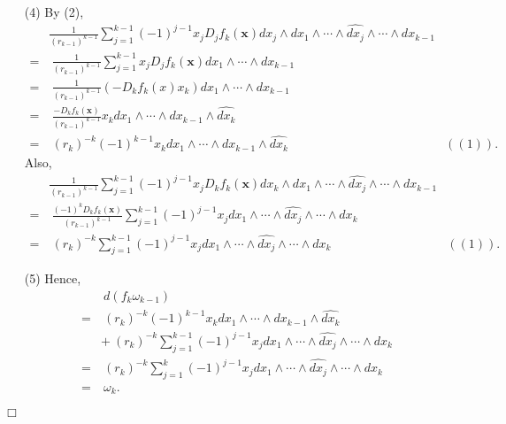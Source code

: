 \documentclass{article}
\begin{document}
\begin{enumerate}
\item[(4)]
  By (2),
  \begin{align*}
    &\frac{1}{(r_{k-1})^{k-1}}
      \sum_{j=1}^{k-1}
      (-1)^{j-1} x_j D_j f_k(\mathbf{x})
      dx_j \wedge dx_1 \wedge \cdots
        \wedge \widehat{dx_j} \wedge \cdots \wedge dx_{k-1} \\
    =& \:
    \frac{1}{(r_{k-1})^{k-1}}
      \sum_{j=1}^{k-1}
      x_j D_j f_k(\mathbf{x})
      dx_1 \wedge \cdots \wedge dx_{k-1} \\
    =& \:
    \frac{1}{(r_{k-1})^{k-1}}
      (-D_k f_k(x) x_k)
      dx_1 \wedge \cdots \wedge dx_{k-1} \\
    =& \:
    \frac{-D_k f_k(\mathbf{x})}{(r_{k-1})^{k-1}}
      x_k dx_1 \wedge \cdots \wedge dx_{k-1} \wedge \widehat{dx_{k}} \\
    =& \:
    (r_{k})^{-k}
      (-1)^{k-1} x_k dx_1 \wedge \cdots \wedge dx_{k-1} \wedge \widehat{dx_{k}}
      & ((1)).
  \end{align*}
  Also,
  \begin{align*}
    &\frac{1}{(r_{k-1})^{k-1}}
      \sum_{j=1}^{k-1}
      (-1)^{j-1} x_j D_k f_k(\mathbf{x})
      dx_k \wedge dx_1 \wedge \cdots
        \wedge \widehat{dx_j} \wedge \cdots \wedge dx_{k-1} \\
    =& \:
    \frac{(-1)^{k} D_k f_k(\mathbf{x})}{(r_{k-1})^{k-1}}
      \sum_{j=1}^{k-1} (-1)^{j-1} x_j
        dx_1 \wedge \cdots \wedge \widehat{dx_j} \wedge \cdots \wedge dx_{k} \\
    =& \:
    (r_{k})^{-k}
      \sum_{j=1}^{k-1} (-1)^{j-1} x_j
        dx_1 \wedge \cdots \wedge \widehat{dx_j} \wedge \cdots \wedge dx_{k}
      & ((1)).
  \end{align*}

\item[(5)]
  Hence,
  \begin{align*}
    & \: d(f_k \omega_{k-1}) \\
    =& \: (r_{k})^{-k}
      (-1)^{k-1} x_k dx_1 \wedge \cdots \wedge dx_{k-1} \wedge \widehat{dx_{k}} \\
      &+ \: (r_{k})^{-k}
        \sum_{j=1}^{k-1} (-1)^{j-1} x_j
          dx_1 \wedge \cdots \wedge \widehat{dx_j} \wedge \cdots \wedge dx_{k} \\
    =& \: (r_{k})^{-k}
      \sum_{j=1}^{k} (-1)^{j-1} x_j
        dx_1 \wedge \cdots \wedge \widehat{dx_j} \wedge \cdots \wedge dx_{k} \\
    =& \: \omega_{k}.
  \end{align*}
\end{enumerate}
$\Box$ \\
\end{document}
